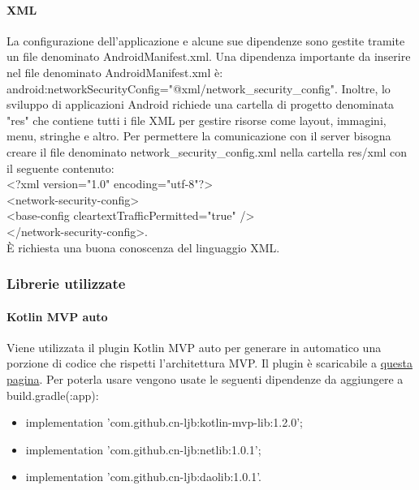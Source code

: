 \paragraph{XML}
La configurazione dell'applicazione e alcune sue dipendenze sono gestite tramite un file denominato AndroidManifest.xml. Una dipendenza importante da inserire nel file denominato AndroidManifest.xml è: android:networkSecurityConfig="@xml/network\_security\_config".  Inoltre, lo sviluppo di applicazioni Android richiede una cartella di progetto denominata "res" che contiene tutti i file XML per gestire risorse come layout, immagini, menu, stringhe e altro. 
Per permettere la comunicazione con il server bisogna creare il file denominato network\_security\_config.xml nella cartella res/xml con il seguente contenuto:\\ <?xml version="1.0" encoding="utf-8"?>\\
<network-security-config>\\
<base-config cleartextTrafficPermitted="true" />\\
</network-security-config>.\\
È richiesta una buona conoscenza del linguaggio XML.

\subsubsection{Librerie utilizzate}

\paragraph{Kotlin MVP auto}
Viene utilizzata il plugin Kotlin MVP auto per generare in automatico una porzione di codice che rispetti l'architettura MVP. Il plugin è scaricabile a \href{https://plugins.jetbrains.com/plugin/12265-kotlin-mvp-auto}{questa pagina}.
Per poterla usare vengono usate le seguenti dipendenze da aggiungere a build.gradle(:app):\\
\begin{itemize}
	\item implementation 'com.github.cn-ljb:kotlin-mvp-lib:1.2.0'; \\
	\item implementation 'com.github.cn-ljb:netlib:1.0.1'; \\
	\item implementation 'com.github.cn-ljb:daolib:1.0.1'. \\
\end{itemize}

